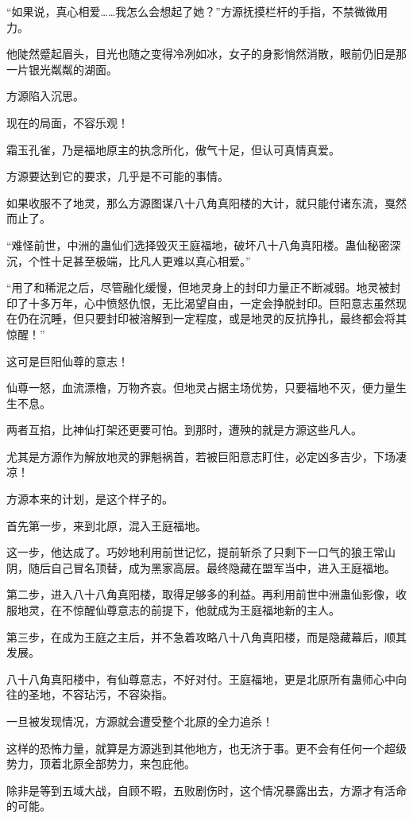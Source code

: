 \begin{this_body}
“如果说，真心相爱……我怎么会想起了她？”方源抚摸栏杆的手指，不禁微微用力。

他陡然蹙起眉头，目光也随之变得冷冽如冰，女子的身影悄然消散，眼前仍旧是那一片银光粼粼的湖面。

方源陷入沉思。

现在的局面，不容乐观！

霜玉孔雀，乃是福地原主的执念所化，傲气十足，但认可真情真爱。

方源要达到它的要求，几乎是不可能的事情。

如果收服不了地灵，那么方源图谋八十八角真阳楼的大计，就只能付诸东流，戛然而止了。

“难怪前世，中洲的蛊仙们选择毁灭王庭福地，破坏八十八角真阳楼。蛊仙秘密深沉，个性十足甚至极端，比凡人更难以真心相爱。”

“用了和稀泥之后，尽管融化缓慢，但地灵身上的封印力量正不断减弱。地灵被封印了十多万年，心中愤怒仇恨，无比渴望自由，一定会挣脱封印。巨阳意志虽然现在仍在沉睡，但只要封印被溶解到一定程度，或是地灵的反抗挣扎，最终都会将其惊醒！”

这可是巨阳仙尊的意志！

仙尊一怒，血流漂橹，万物齐哀。但地灵占据主场优势，只要福地不灭，便力量生生不息。

两者互掐，比神仙打架还更要可怕。到那时，遭殃的就是方源这些凡人。

尤其是方源作为解放地灵的罪魁祸首，若被巨阳意志盯住，必定凶多吉少，下场凄凉！

方源本来的计划，是这个样子的。

首先第一步，来到北原，混入王庭福地。

这一步，他达成了。巧妙地利用前世记忆，提前斩杀了只剩下一口气的狼王常山阴，随后自己冒名顶替，成为黑家高层。最终隐藏在盟军当中，进入王庭福地。

第二步，进入八十八角真阳楼，取得足够多的利益。再利用前世中洲蛊仙影像，收服地灵，在不惊醒仙尊意志的前提下，他就成为王庭福地新的主人。

第三步，在成为王庭之主后，并不急着攻略八十八角真阳楼，而是隐藏幕后，顺其发展。

八十八角真阳楼中，有仙尊意志，不好对付。王庭福地，更是北原所有蛊师心中向往的圣地，不容玷污，不容染指。

一旦被发现情况，方源就会遭受整个北原的全力追杀！

这样的恐怖力量，就算是方源逃到其他地方，也无济于事。更不会有任何一个超级势力，顶着北原全部势力，来包庇他。

除非是等到五域大战，自顾不暇，五败剧伤时，这个情况暴露出去，方源才有活命的可能。


\end{this_body}
